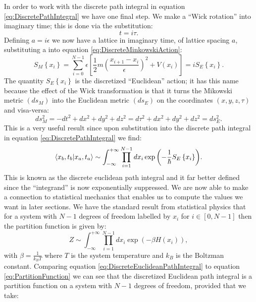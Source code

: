 \documentclass[12pt]{article}
\begin{document}
In order to work with the discrete path integral in equation \ref{eq:DiscretePathIntegral} we have one final step. We make a ``Wick rotation'' into imaginary time; this is done via the substitution:
\begin{equation}
	\label{eq:WickRotation}
	t = i\tau.
\end{equation}
Defining $a=i\epsilon$ we now have a lattice in imaginary time, of lattice spacing $a$, substituting a into equation \ref{eq:DiscreteMinkowskiAction}:
\begin{equation}
	\label{eq:DiscreteEuclideanAction}
	S_M\left\{x_i\right\} = \sum_{i=0}^{N-1} \epsilon \left[\frac{1}{2}m\left(\frac{x_{i+1}-x_{i}}{\epsilon}\right)^2 + V(x_i)\right] = iS_E\left\{x_i\right\}.
\end{equation}
The quantity $S_{E}\left\{x_i\right\}$ is the discretized ``Euclidean'' action; it has this name because the effect of the Wick transformation is that it turns the Mikowski metric $\left(ds_{M}\right)$ into the Euclidean metric $\left(ds_{E}\right)$ on the coordinates $\left(x,y,z,\tau\right)$ and visa-versa:
\begin{equation}
	\label{eq:MetricTransform}
	 ds_{M}^{2}= -dt^2 + dx^2 + dy^2 + dz^2 = d\tau^2 + dx^2 + dy^2 + dz^2 = ds_{E}^{2}.
\end{equation}
This is a very useful result since upon substitution into the discrete path integral in equation \ref{eq:DiscretePathIntegral} we find:
\begin{equation}
	\label{eq:DiscreteEuclideanPathIntegral}
	\braket{x_b,t_b|x_a,t_a} \sim \int^{+\infty}_{-\infty}\prod_{i=1}^{N-1}dx_i \exp{\left(-\frac{1}{\hbar}S_{E}\left\{x_i\right\}\right)}.
\end{equation}
This is known as the discrete euclidean path integral and it far better defined since the ``integrand'' is now exponentially suppressed. We are now able to make a connection to statistical mechanics that enables us to compute the values we want in later sections. We have the standard result from statistical physics that for a system with $N-1$ degrees of freedom labelled by $x_i$ for $i \in \left[0,N-1\right]$ then the partition function is given by:
\begin{equation}
	\label{eq:PartitionFunction}
	Z \sim \int_{-\infty}^{+\infty}\prod_{i=1}^{N-1}dx_{i}\exp{\left(-\beta H\left({x_i}\right)\right)},
\end{equation}
with $\beta=\frac{1}{k_{B}T}$ where $T$ is the system temperature and $k_{B}$ is the Boltzman constant. Comparing equation \ref{eq:DiscreteEuclideanPathIntegral} to equation \ref{eq:PartitionFunction} we can see that the discretized Euclidean path integral is a partition function on a system with $N-1$ degrees of freedom, provided that we take:
\end{document}
